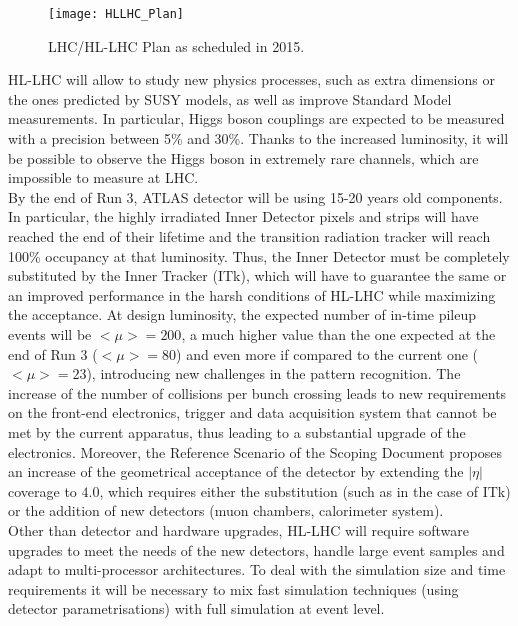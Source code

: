 \documentclass[a4paper,twoside,12pt]{article}
\begin{document}
\begin{figure} [h]
	\texttt{[image: HLLHC\_Plan]}
	\caption{LHC/HL-LHC Plan as scheduled in 2015\cite{scoping}.}
	\label{fig:HLLHC_Plan}
\end{figure}

HL-LHC will allow to study new physics processes, such as extra dimensions or the ones predicted by SUSY models, as well as improve Standard Model measurements. In particular, Higgs boson 
couplings are expected to be measured with a precision between 5\% and 30\%\cite{loi}. Thanks to the increased luminosity, it will be possible to observe the Higgs boson in extremely
rare channels, which are impossible to measure at LHC.\\

By the end of Run 3, ATLAS detector will be using 15-20 years old components. In particular,
the highly irradiated Inner Detector pixels and strips will have reached the end of their
lifetime and the transition radiation tracker will reach 100\% occupancy at that luminosity. Thus, the Inner Detector must be completely substituted by the Inner Tracker (ITk), which will
have to guarantee the same or an improved performance in the harsh conditions of HL-LHC while maximizing the acceptance. At design luminosity, the expected number of in-time pileup events will be $<\mu > = 200$, a much
higher value than the one expected at the end of Run 3 ($<\mu > = 80$) and even more if 
compared to the current one ($<\mu > = 23$), introducing new challenges in the pattern
recognition. The increase of the number
of collisions per bunch crossing leads to new requirements on the front-end electronics, trigger and data acquisition system that cannot be met by the current apparatus, thus leading to a 
substantial upgrade of the electronics. Moreover, the Reference Scenario of the Scoping Document\cite{scoping} proposes an increase of the geometrical acceptance of the detector by extending the $|\eta|$ coverage to $4.0$, which requires either the substitution (such as in the case of ITk) or the addition of new detectors (muon chambers,
calorimeter system). \\

Other than detector and hardware upgrades, HL-LHC will require software upgrades to meet the needs of the new detectors, handle large event samples and adapt to multi-processor
architectures. To deal with the simulation size and time requirements it will be necessary to mix fast simulation techniques (using detector parametrisations) with full simulation at event level.\\
\end{document}
